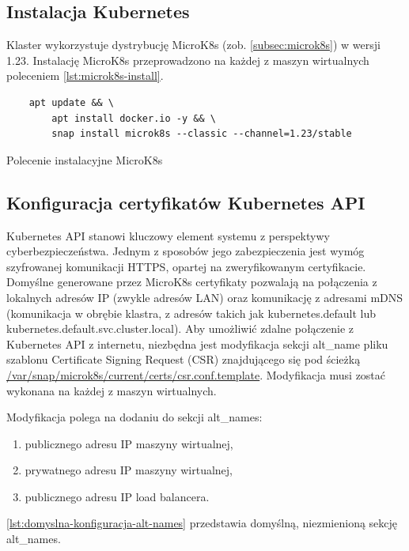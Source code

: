 \subsection{Instalacja Kubernetes}

Klaster wykorzystuje dystrybucję MicroK8s (zob. \autoref{subsec:microk8s}) w wersji 1.23.
Instalację MicroK8s przeprowadzono na każdej z maszyn wirtualnych poleceniem \autoref{lst:microk8s-install}.

\begin{listing}[H]
    \begin{verbatim}
    apt update && \
        apt install docker.io -y && \
        snap install microk8s --classic --channel=1.23/stable
    \end{verbatim}
    \caption{Polecenie instalacyjne MicroK8s}
    \label{lst:microk8s-install}
\end{listing}

\subsection{Konfiguracja certyfikatów Kubernetes API}

Kubernetes API stanowi kluczowy element systemu z perspektywy cyberbezpieczeństwa.
Jednym z sposobów jego zabezpieczenia jest wymóg szyfrowanej komunikacji HTTPS, opartej na zweryfikowanym certyfikacie.
Domyślne generowane przez MicroK8s certyfikaty pozwalają na połączenia z lokalnych adresów IP (zwykle adresów LAN) oraz komunikację z adresami mDNS (komunikacja w obrębie klastra, z adresów takich jak kubernetes.default lub kubernetes.default.svc.cluster.local).
Aby umożliwić zdalne połączenie z Kubernetes API z internetu, niezbędna jest modyfikacja sekcji alt\_name pliku szablonu Certificate Signing Request (CSR) znajdującego się pod ścieżką \url{/var/snap/microk8s/current/certs/csr.conf.template}.
Modyfikacja musi zostać wykonana na każdej z maszyn wirtualnych.

\noindent Modyfikacja polega na dodaniu do sekcji alt\_names:
\begin{enumerate}
    \item publicznego adresu IP maszyny wirtualnej,
    \item prywatnego adresu IP maszyny wirtualnej,
    \item publicznego adresu IP load balancera.
\end{enumerate}

\noindent\autoref{lst:domyslna-konfiguracja-alt-names} przedstawia domyślną, niezmienioną sekcję alt\_names.

